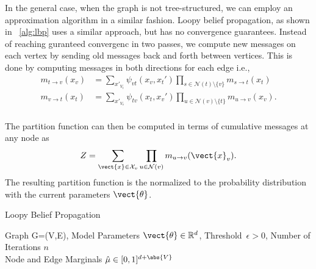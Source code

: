 

In the general case, when the graph is not tree-structured, we can employ an approximation algorithm in a similar fashion. 
Loopy belief propagation, as shown in \alg~\ref{alg:lbp} uses a similar approach, but has no convergence guarantees.
Instead of reaching guranteed convergenc in two passes, we compute new messages on each vertex by sending old messages back and forth between vertices.
This is done by computing messages in both directions for each edge i.e., 
\begin{equation}
    \begin{split}
        \label{eq:mespas}
        m_{t \rightarrow v}(x_v) &= \sum_{x'_{V_t}} \psi_{vt}(x_v, x_t') \prod_{s\in \mathcal{N}(t) \setminus \{v\}} m_{s \rightarrow t}(x_t) \\
        m_{v \rightarrow t}(x_t) &= \sum_{x'_{V_v}} \psi_{tv}(x_t, x_v') \prod_{u\in \mathcal{N}(v) \setminus \{t\}} m_{u \rightarrow v}(x_v). \\
    \end{split}
\end{equation}

The partition function can then be computed in terms of cumulative messages\cite{piatkowski2018exponential} at any node as 
\begin{equation}
    Z = \sum_{\vect{x} \in \mathcal{X}_v} \prod_{u \in \mathcal{N}(v)} m_{u \rightarrow v}(\vect{x}_v).
\end{equation} 
The resulting partition function is the normalized to the probability distribution with the current parameters $\vect{\theta}$.

\begin{algo}{Loopy Belief Propagation}
    \begin{algorithm}[H]
        \caption{Loopy Belief Propagation}
        \begin{algorithmic}
            \label{alg:lbp}
            \REQUIRE Graph G=(V,E), Model Parameters $\vect{\theta} \in \mathbb{R}^d$, Threshold~$\epsilon > 0$, Number of Iterations $n$\\
            \ENSURE  Node and Edge Marginals $\hat{\mu} \in [0,1]^{d + \abs{V}}$ \\
                \\
                \ENDFOR
                \\
                \\
                \ENDIF
            \ENDFOR
        \end{algorithmic}
    \end{algorithm}
\end{algo}
